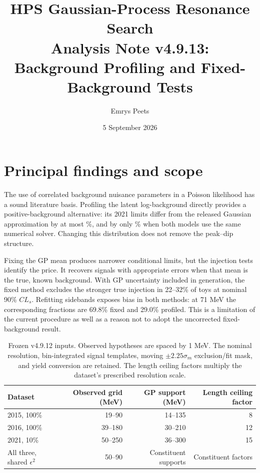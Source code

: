 \documentclass[11pt]{article}
\title{HPS Gaussian-Process Resonance Search\\
Analysis Note v4.9.13:\\Background Profiling and Fixed-Background Tests}
\author{Emrys Peets}
\date{5 September 2026}
\newcommand{\eps}{\ensuremath{\epsilon}}
\newcommand{\CLs}{\ensuremath{CL_s}}
\begin{document}
\maketitle
\begin{center}
\end{center}

\section{Principal findings and scope}

The use of correlated background nuisance parameters in a Poisson likelihood
has a sound literature basis. Profiling the latent log-background directly
provides a positive-background alternative: its 2021 limits differ from the
released Gaussian approximation by at most \LogReleaseMax\%, and by only
\LogControlMax\% when both models use the same numerical solver. Changing this
distribution does not remove the peak--dip structure.

Fixing the GP mean produces narrower conditional limits, but the injection
tests identify the price. It recovers signals with appropriate errors when
that mean is the true, known background. With GP uncertainty included in
generation, the fixed method excludes the stronger true injection in
22--32\% of toys at nominal 90\% \CLs. Refitting sidebands exposes bias in both
methods: at 71 MeV the corresponding fractions are 69.8\% fixed and 29.0\%
profiled. This is a limitation of the current procedure as well as a reason
not to adopt the uncorrected fixed-background result.

\begin{table}[H]\centering\small
\begin{tabular}{lrrr}\toprule
Dataset & Observed grid (MeV) & GP support (MeV) & Length ceiling factor\\\midrule
2015, 100\% & 19--90 & 14--135 & 8\\
2016, 100\% & 39--180 & 30--210 & 12\\
2021, 10\% & 50--250 & 36--300 & 15\\
All three, shared $\eps^2$ & 50--90 & Constituent supports & Constituent factors\\
\bottomrule\end{tabular}
\caption{Frozen v4.9.12 inputs. Observed hypotheses are spaced by 1 MeV.
The nominal resolution, bin-integrated signal templates, moving
$\pm2.25\sigma_m$ exclusion/fit mask, and yield conversion are retained.
The length ceiling factors multiply the dataset's prescribed resolution scale.}
\label{tab:inputs}\end{table}
\end{document}
